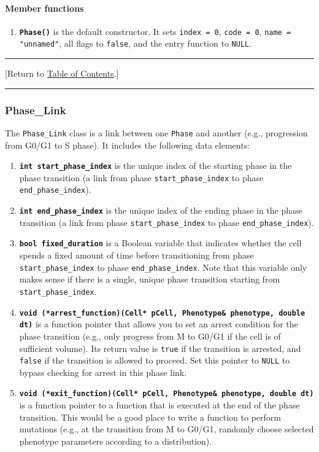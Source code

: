 \documentclass[12pt]{article}
\renewcommand{\v}{\verb}
\newcommand{\smallcode}[1]{\textbf{\texttt{#1}}}
\newcommand{\blue}[1]{\textcolor{blue}{#1}}
\newcommand{\DONE}{}%
\newcommand{\TOClink}{\begin{center}\hrule\vskip-10pt\phantom{.}\hfill[Return to \hyperlink{TOC}{Table of Contents}.]\hfill\phantom{.}\vskip3pt\hrule\end{center}}
\begin{document}
\paragraph{Member functions}
\begin{enumerate}
\item
\smallcode{Phase()} is the default constructor. It sets \v|index = 0|, 
\v|code = 0|, \v|name = "unnamed"|, all flags to \v|false|, and 
the entry function to \v|NULL|. 
\end{enumerate}

\TOClink 

\subsubsection{Phase\_Link \DONE}
\label{sec:Phase_Link}
The \v|Phase_Link| class is a link between one \v|Phase| and another (e.g., progression from G0/G1 to S phase). 
It includes the following data elements: 

\begin{enumerate}
\item
\smallcode{int start\_phase\_index} is the unique index of the starting phase in the phase transition 
(a link from phase 
\v|start_phase_index| to phase \v|end_phase_index|). 

\item
\smallcode{int end\_phase\_index} is the unique index of the ending phase in the phase transition 
(a link from phase 
\v|start_phase_index| to phase \v|end_phase_index|). 

\item
\smallcode{bool fixed\_duration} is a Boolean variable that indicates whether the cell spends a fixed amount 
of time before transitioning from phase 
\v|start_phase_index| to phase \v|end_phase_index|. Note that this variable only 
makes sense if there is a single, unique phase transition starting from 
\v|start_phase_index|. 

\item 
\smallcode{void (*arrest\_function)(Cell* pCell, Phenotype\& phenotype, double dt)} is a function pointer that allows you to 
set an arrest condition for the phase transition  
(e.g., only progress from M to G0/G1 if the cell is of sufficient volume). 
Its return value is \v|true| if the transition is 
arrested, and \v|false| if the transition is allowed to proceed. Set this pointer to \v|NULL| 
to bypass checking for arrest in this phase link. 

\item 
\smallcode{void (*exit\_function)(Cell* pCell, Phenotype\& phenotype, double dt)} is a function pointer to a function that is 
executed at the end of the phase transition. This would be a good place to write a function to 
perform mutations (e.g., at the transition from M to G0/G1, randomly choose selected phenotype 
parameters according to a distribution). 
\end{enumerate}
\end{document}
